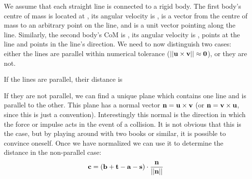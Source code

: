 We assume that each straight line is connected to a rigid body. The first body's centre of mass
is located at , its angular velocity is \ve{\omega},  is a vector from the centre
of mass to an arbitrary point on the line, and  is a unit vector pointing along the line.
Similarly, the second body's CoM is , its angular velocity is \ve{\phi},  points at
the line and  points in the line's direction. We need to now distinguish two cases:
either the lines are parallel within numerical tolerance
($\norm{\ve{u}\times\ve{v}} \approx \ve{0}$), or they are not.

If the lines are parallel, their distance is %

If they are not parallel, we can find a unique plane which contains one line and is parallel to
the other. This plane has a normal vector $\ve{n} = \ve{u}\times\ve{v}$ (or
$\ve{n} = \ve{v}\times\ve{u}$, since this is just a convention). Interestingly this normal is the
direction in which the force or impulse acts in the event of a collision. It is not obvious that
this is the case, but by playing around with two books or similar, it is possible to convince
oneself. Once we have normalized  we can use it to determine the distance in the
non-parallel case:
\begin{equation}
\ve{c} = (\ve{b} + \ve{t} - \ve{a} - \ve{s})\cdot\frac{\ve{n}}{\norm{\ve{n}}}
\end{equation}
